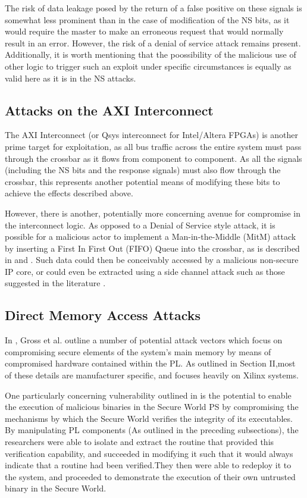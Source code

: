 \documentclass[journal]{IEEEtran}
\begin{document}
The risk of data leakage posed by the return of a false positive on these signals is
somewhat less prominent than in the case of modification of the NS bits, as it would
require the master to make an erroneous request that would normally result in an error. 
However, the risk of a denial of service attack remains present. Additionally, it is worth
mentioning that the poossibility of the malicious use of other logic to trigger such an
exploit under specific circumstances is equally as valid here as it is in the NS attacks.

\subsection{Attacks on the AXI Interconnect}
The AXI Interconnect (or Qsys interconnect for Intel/Altera FPGAs) is another prime target
for exploitation, as all bus traffic across the entire system must pass through the
crossbar as it flows from component to component. As all the signals (including the NS
bits and the response signals) must also flow through the crossbar, this represents
another potential means of modifying these bits to achieve the effects described above.

However, there is another, potentially more concerning avenue for compromise in the
interconnect logic. As opposed to a Denial of Service style attack, it is possible for a
malicious actor to implement a Man-in-the-Middle (MitM) attack by inserting a First In
First Out (FIFO) Queue into the crossbar, as is described in \cite{benhani_security_2017}
and \cite{benhani_security_2019}. Such data could then be conceivably accessed by a
malicious non-secure IP core, or could even be extracted using a side channel attack such
as those suggested in the literature \cite{bukasa_how_2018}.

\subsection{Direct Memory Access Attacks}
In \cite{gross_breaking_2019}, Gross et al. outline a number of potential attack vectors
which focus on compromising secure elements of the system's main memory by means of 
compromised hardware contained within the PL. As outlined in Section II,most of these
details are manufacturer specific, and \cite{gross_breaking_2019} focuses heavily on
Xilinx systems.

One particularly concerning vulnerability outlined in \cite{gross_breaking_2019} is the
potential to enable the execution of malicious binaries in the Secure World PS by 
compromising the mechanisms by which the Secure World verifies the integrity of its
executables. By manipulating PL components (As outlined in the preceding subsections),
the researchers were able to isolate and extract the routine that provided this
verification capability, and succeeded in modifying it such that it would always indicate
that a routine had been verified.They then were able to redeploy it to the system, and
proceeded to demonstrate the execution of their own untrusted binary in the Secure World.
\end{document}
